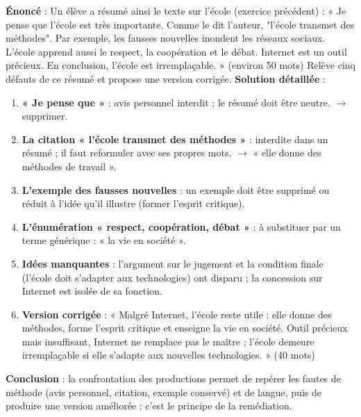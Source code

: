 \documentclass[11pt]{article}
\begin{document}
\begin{exoresolu}
\textbf{Énoncé} : Un élève a résumé ainsi le texte sur l'école (exercice précédent) :
« Je pense que l'école est très importante. Comme le dit l'auteur, "l'école transmet des méthodes". Par exemple, les fausses nouvelles inondent les réseaux sociaux. L'école apprend aussi le respect, la coopération et le débat. Internet est un outil précieux. En conclusion, l'école est irremplaçable. » (environ 50 mots)
Relève cinq défauts de ce résumé et propose une version corrigée.
\tcblower
\textbf{Solution détaillée} :
\begin{enumerate}
\item \textbf{« Je pense que »} : avis personnel interdit ; le résumé doit être neutre. $\rightarrow$ supprimer.
\item \textbf{La citation « l'école transmet des méthodes »} : interdite dans un résumé ; il faut reformuler avec ses propres mots. $\rightarrow$ « elle donne des méthodes de travail ».
\item \textbf{L'exemple des fausses nouvelles} : un exemple doit être supprimé ou réduit à l'idée qu'il illustre (former l'esprit critique).
\item \textbf{L'énumération « respect, coopération, débat »} : à substituer par un terme générique : « la vie en société ».
\item \textbf{Idées manquantes} : l'argument sur le jugement et la condition finale (l'école doit s'adapter aux technologies) ont disparu ; la concession sur Internet est isolée de sa fonction.
\item \textbf{Version corrigée} : « Malgré Internet, l'école reste utile : elle donne des méthodes, forme l'esprit critique et enseigne la vie en société. Outil précieux mais insuffisant, Internet ne remplace pas le maître ; l'école demeure irremplaçable si elle s'adapte aux nouvelles technologies. » (40 mots)
\end{enumerate}
\textbf{Conclusion} : la confrontation des productions permet de repérer les fautes de méthode (avis personnel, citation, exemple conservé) et de langue, puis de produire une version améliorée : c'est le principe de la remédiation.
\end{exoresolu}
\end{document}
